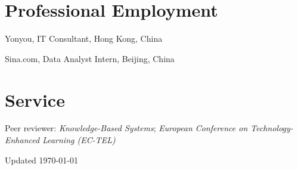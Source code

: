 \documentclass[11pt,letterpaper]{report}
\begin{document}
    \section*{Professional Employment}

    \begin{tablist}

        \item[May 2019--Aug 2019] \tab{}Yonyou, IT Consultant, Hong Kong, China
        \item[Jun 2017--Aug 2017] \tab{}Sina.com, Data Analyst Intern, Beijing, China
        
    \end{tablist}

    \section*{Service}

    Peer reviewer: \textit{Knowledge-Based Systems}; \textit{European Conference on Technology-Enhanced Learning (EC-TEL)}

    \begin{center}
        \vfill
        Updated \monthyeardate\today
    \end{center}
\end{document}
